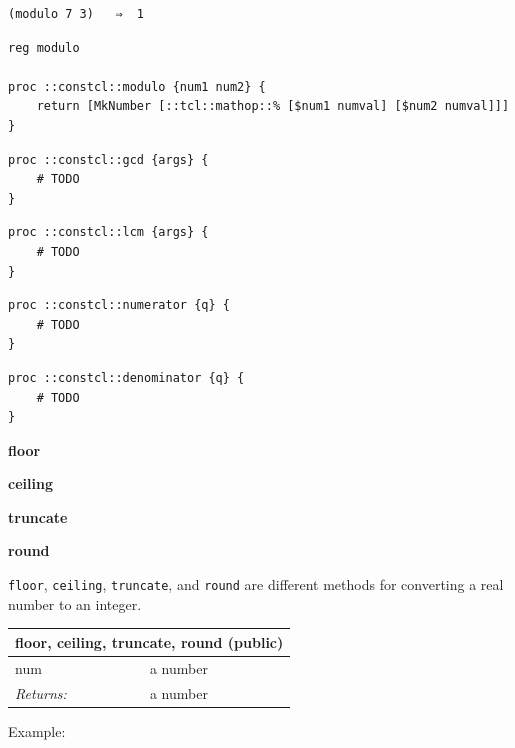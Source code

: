 \documentclass[twoside,9pt]{report}
\begin{document}
\noindent\makebox[\linewidth]{\rule{\linewidth}{0.4pt}}
\begin{lstlisting}
(modulo 7 3)   ⇒  1
\end{lstlisting}
\noindent\makebox[\linewidth]{\rule{\linewidth}{0.4pt}}
\noindent\makebox[\linewidth]{\rule{\linewidth}{0.4pt}}
\begin{lstlisting}
reg modulo
 
proc ::constcl::modulo {num1 num2} {
    return [MkNumber [::tcl::mathop::% [$num1 numval] [$num2 numval]]]
}
\end{lstlisting}
\noindent\makebox[\linewidth]{\rule{\linewidth}{0.4pt}}
\noindent\makebox[\linewidth]{\rule{\linewidth}{0.4pt}}
\begin{lstlisting}
proc ::constcl::gcd {args} {
    # TODO
}
\end{lstlisting}
\noindent\makebox[\linewidth]{\rule{\linewidth}{0.4pt}}
\noindent\makebox[\linewidth]{\rule{\linewidth}{0.4pt}}
\begin{lstlisting}
proc ::constcl::lcm {args} {
    # TODO
}
\end{lstlisting}
\noindent\makebox[\linewidth]{\rule{\linewidth}{0.4pt}}
\noindent\makebox[\linewidth]{\rule{\linewidth}{0.4pt}}
\begin{lstlisting}
proc ::constcl::numerator {q} {
    # TODO
}
\end{lstlisting}
\noindent\makebox[\linewidth]{\rule{\linewidth}{0.4pt}}
\noindent\makebox[\linewidth]{\rule{\linewidth}{0.4pt}}
\begin{lstlisting}
proc ::constcl::denominator {q} {
    # TODO
}
\end{lstlisting}
\noindent\makebox[\linewidth]{\rule{\linewidth}{0.4pt}}

\textbf{floor}


\textbf{ceiling}


\textbf{truncate}


\textbf{round}


\texttt{floor}, \texttt{ceiling}, \texttt{truncate}, and \texttt{round} are different methods for converting a real number to an integer.

\begin{tabular}{ |l l| }
\hline
\multicolumn{2}{|l|}{floor, ceiling, truncate, round (public)} \\
\hline
num & a number \\
\textit{Returns:} & a number \\
\hline
\end{tabular}


Example:
\end{document}
